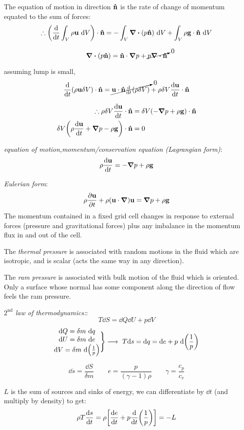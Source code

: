\documentclass[10pt, a4paper, twocolumn]{article}
\newcommand{\deff}[1]{\par \noindent \textit{#1}: }
\newcommand{\arr}{\ensuremath{\longrightarrow\ }}
\begin{document}
The equation of motion in direction $\vb{\hat n}$ is the rate of change of momentum equated to the sum of forces:
\[\therefore
\pqty{\dv{t}\int_V\rho\vb u\ \dd V}
\cdot \vb{\hat n}
=-\int _V\div{(p\vb{\hat n})}\ \dd V
+\int _V\rho\vb g\cdot\vb{\hat n}\ \dd V
\]

\[\div{(p\vb{\hat n})}=\vb{\hat n}\cdot\grad p
+\cancelto{0}{p\div{\vb{\hat n}}}\]

assuming lump is small,
\[\dv{t}(\rho\vb u\delta V)\cdot\vb{\hat n}
=\cancelto{0}{\vb u\cdot\vb{\hat n}
\tfrac{\dd}{\dd t}(\rho\delta V)}
+\rho\delta V\dv{\vb u}{t}\cdot \vb{\hat n}\]

\begin{equation*}
\begin{aligned}
\therefore
\rho\delta V\dv{\vb u}{t}\cdot\vb{\hat n}
&=\delta V(-\grad p +\rho\vb g)\cdot \vb{\hat n}
\\ \delta V\pqty{\rho\dv{\vb u}{t}+\grad p-\rho\vb g}
\cdot\vb{\hat n} &=0
\end{aligned}
\end{equation*}

\deff{equation of motion,momentum/conservation equation (Lagrangian form)}
\[\rho\dv{\vb u}{t}=-\grad p+\rho\vb g\]

\deff{Eulerian form}
\[\rho\pdv{\vb u}{t}+\rho(\vb u\cdot
\grad{})\vb u
=\grad p+\rho \vb g\]
The momentum contained in a fixed grid cell changes in response to external forces (pressure and gravitational forces) plus any imbalance in the momentum flux in and out of the cell.

The \emph{thermal pressure} is associated with random motions in the fluid which are isotropic, and is scalar (acts the same way in any direction).

The \emph{ram pressure} is associated with bulk motion of the fluid which is oriented. Only a surface whose normal has some component along the direction of flow feels the ram pressure.

\deff{$2^\text{nd}$ law of thermodynamics:}
\[T\dd S=\dd Q
\dd U+p\dd V\]
\[
\mqty{
\dd Q=\delta m\ \dd q
\\ \dd U=\delta m\ \dd e
\\ \dd V=\delta m\ \dd \pqty{\frac1p}
}\Bigg\}\arr
T\dd s=\dd q=\dd e+p\ \dd \pqty{\frac1p}
\]

\[\dd s=\frac{\dd S}{\delta m}
\qquad
e=\frac{p}{(\gamma-1)\rho}
\qquad
\gamma=\frac{c_p}{c_v}\]

$L$ is the sum of sources and sinks of energy, we can differentiate by $\dd t$ (and multiply by density) to get:
\[\rho T\dv{s}{t}
=\rho\bqty{\dv{e}{t}
+p\dv{t}\pqty{\frac1p}}=-L\]
\end{document}
